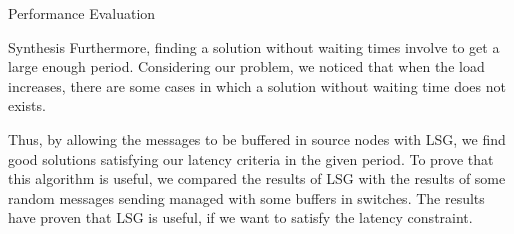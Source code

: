 \documentclass[a4paper,10pt]{report}
\begin{document}
\begin{chapter}{Performance Evaluation}
\begin{section}{Synthesis}
Furthermore, finding a solution without waiting times involve to get a large enough period. Considering our problem, we noticed that when the 
load increases, there are some cases in which a solution without waiting time does not exists.

Thus, by allowing the messages to be buffered in source nodes with LSG, we find good solutions satisfying our latency 
criteria in the given period. To prove that this algorithm is useful, we compared the results of LSG with the results of some
random messages sending managed with some buffers in switches. The results have proven that LSG is useful, if we want
to satisfy the latency constraint.

\end{section}

\end{chapter}
\end{document}
